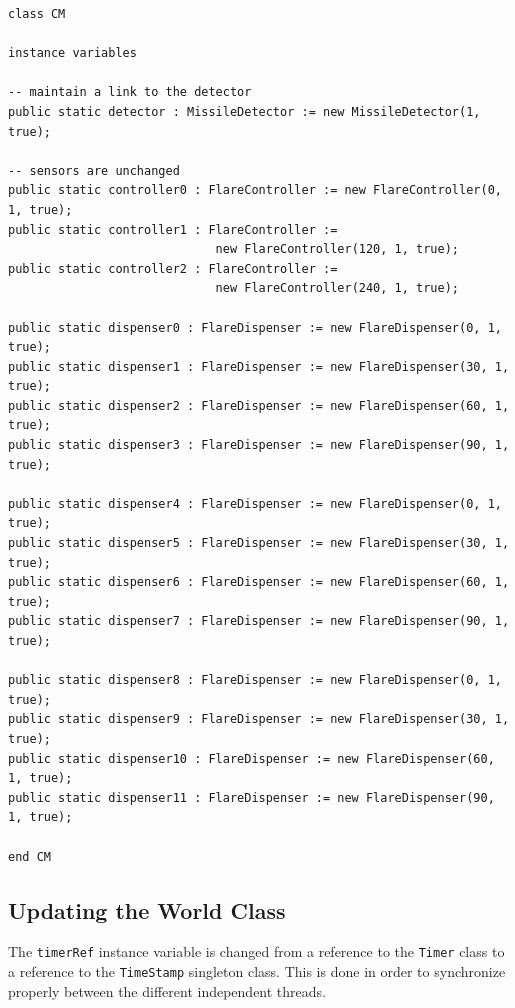 \documentclass{overturerepchap}
\begin{document}
\begin{lstlisting}
class CM
 
instance variables

-- maintain a link to the detector
public static detector : MissileDetector := new MissileDetector(1, true);

-- sensors are unchanged
public static controller0 : FlareController := new FlareController(0, 1, true);
public static controller1 : FlareController := 
                             new FlareController(120, 1, true);
public static controller2 : FlareController := 
                             new FlareController(240, 1, true);

public static dispenser0 : FlareDispenser := new FlareDispenser(0, 1, true);
public static dispenser1 : FlareDispenser := new FlareDispenser(30, 1, true);
public static dispenser2 : FlareDispenser := new FlareDispenser(60, 1, true);
public static dispenser3 : FlareDispenser := new FlareDispenser(90, 1, true);

public static dispenser4 : FlareDispenser := new FlareDispenser(0, 1, true);
public static dispenser5 : FlareDispenser := new FlareDispenser(30, 1, true);
public static dispenser6 : FlareDispenser := new FlareDispenser(60, 1, true);
public static dispenser7 : FlareDispenser := new FlareDispenser(90, 1, true);

public static dispenser8 : FlareDispenser := new FlareDispenser(0, 1, true);
public static dispenser9 : FlareDispenser := new FlareDispenser(30, 1, true);
public static dispenser10 : FlareDispenser := new FlareDispenser(60, 1, true);
public static dispenser11 : FlareDispenser := new FlareDispenser(90, 1, true);

end CM
\end{lstlisting}

\subsection{Updating the World Class}

The \texttt{timerRef} instance variable is changed from a reference to 
the \texttt{Timer} class to a reference to the \texttt{TimeStamp} singleton class.
This is done in order to synchronize properly between the different 
independent threads.

\end{document}
